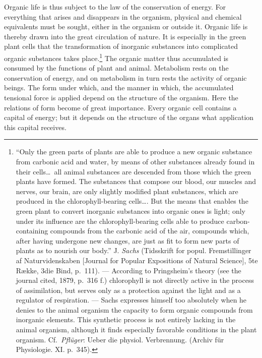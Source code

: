 \documentclass[12pt,a4paper]{book}
\newcommand{\opage}[1]{\marginnote{\footnotesize\textit{[#1]}}}
\begin{document}
Organic life is thus subject to the law of the conservation of energy.
For everything that arises and disappears in the organism, physical and
chemical equivalents must be sought, either in the organism or outside
it. Organic life is thereby drawn into the great circulation of nature.
It is especially in the green plant cells that the transformation of
inorganic substances into complicated organic substances takes
place.\footnote{``Only the green parts of plants are able to produce a
new organic substance from carbonic acid and water, by means of other
substances already found in their cells\ldots\ all animal substances are
descended from those which the green plants have formed. The substances
that compose our blood, our muscles and nerves, our brain, are only
slightly modified plant substances, which are produced in the
chlorophyll-bearing cells\ldots. But the means that enables the green
plant to convert inorganic substances into organic ones is light; only
under its influence are the chlorophyll-bearing cells able to produce
carbon-containing compounds from the carbonic acid of the air,
compounds which, after having undergone new changes, are just as fit to
form new parts of plants as to nourish our body.'' J. \emph{Sachs}
(Tidsskrift for popul. Fremstillinger af Naturvidenskaben [Journal for
Popular Expositions of Natural Science], 5te Række, 3die Bind, p.~111).
--- According to Pringsheim's theory (see the journal cited, 1879,
p.~316 f.) chlorophyll is not directly active in the process of
assimilation, but serves only as a protection against the light and as
a regulator of respiration. --- Sachs expresses himself too absolutely
when he denies to the animal organism the capacity to form organic
compounds from inorganic elements. This synthetic process is not
entirely lacking in the animal organism, although it finds especially
favorable conditions in the plant organism. Cf.\ \emph{Pflüger}: Ueber
die physiol. Verbrennung. (Archiv für Physiologie. XI. p.~345).} The
organic
\opage{43}matter thus accumulated is consumed by the functions of plant
and animal. Metabolism rests on the conservation of energy, and on
metabolism in turn rests the activity of organic beings. The form under
which, and the manner in which, the accumulated tensional force is
applied depend on the structure of the organism. Here the relations of
form become of great importance. Every organic cell contains a capital
of energy; but it depends on the structure of the organs what
application this capital receives.
\end{document}
